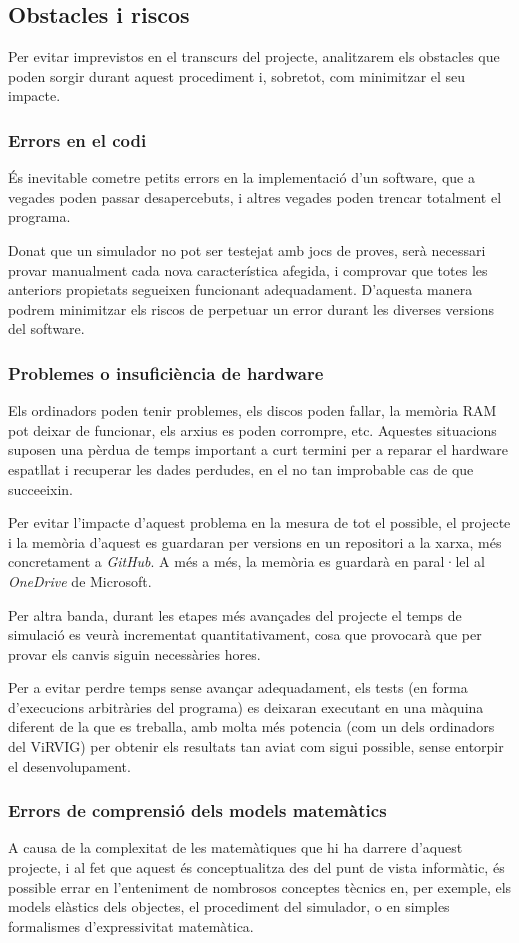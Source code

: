 \documentclass[a4paper]{article} %
\begin{document}
	
	\subsection{Obstacles i riscos}
	Per evitar imprevistos en el transcurs del projecte, analitzarem els obstacles que poden sorgir durant aquest procediment i, sobretot, com minimitzar el seu impacte.
	\subsubsection{Errors en el codi}
	És inevitable cometre petits errors en la implementació d'un software, que a vegades poden passar desapercebuts, i altres vegades poden trencar totalment el programa.\par
	Donat que un simulador no pot ser testejat amb jocs de proves, serà necessari provar manualment cada nova característica afegida, i comprovar que totes les anteriors propietats segueixen funcionant adequadament. D'aquesta manera podrem minimitzar els riscos de perpetuar un error durant les diverses versions del software.
	\subsubsection{Problemes o insuficiència de hardware}
	Els ordinadors poden tenir problemes, els discos poden fallar, la memòria RAM pot deixar de funcionar, els arxius es poden corrompre, etc. Aquestes situacions suposen una pèrdua de temps important a curt termini per a reparar el hardware espatllat i recuperar les dades perdudes, en el no tan improbable cas de que succeeixin. \par
	Per evitar l'impacte d'aquest problema en la mesura de tot el possible, el projecte i la memòria d'aquest es guardaran per versions en un repositori a la xarxa, més concretament a \textit{GitHub}. A més a més, la memòria es guardarà en paral·lel al \textit{OneDrive} de Microsoft.
	\par
	Per altra banda, durant les etapes més avançades del projecte el temps de simulació es veurà incrementat quantitativament, cosa que provocarà que per provar els canvis siguin necessàries hores. \par
	Per a evitar perdre temps sense avançar adequadament, els tests (en forma d'execucions arbitràries del programa) es deixaran executant en una màquina diferent de la que es treballa, amb molta més potencia (com un dels ordinadors del ViRVIG) per obtenir els resultats tan aviat com sigui possible, sense entorpir el desenvolupament.
	\subsubsection{Errors de comprensió dels models matemàtics}
	A causa de la complexitat de les matemàtiques que hi ha darrere d'aquest projecte, i al fet que aquest és conceptualitza des del punt de vista informàtic, és possible errar en l'enteniment de nombrosos conceptes tècnics en, per exemple, els models elàstics dels objectes, el procediment del simulador, o en simples formalismes d'expressivitat matemàtica. 
\end{document}
